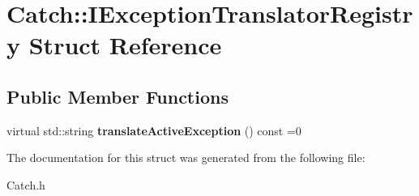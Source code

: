 \hypertarget{struct_catch_1_1_i_exception_translator_registry}{\section{Catch\-:\-:I\-Exception\-Translator\-Registry Struct Reference}
\label{struct_catch_1_1_i_exception_translator_registry}
}
\subsection*{Public Member Functions}
\begin{DoxyCompactItemize}
\item 
\hypertarget{struct_catch_1_1_i_exception_translator_registry_af76ae8c331a17f2a94c9720bc0d686bb}{virtual std\-::string {\bfseries translate\-Active\-Exception} () const =0}\label{struct_catch_1_1_i_exception_translator_registry_af76ae8c331a17f2a94c9720bc0d686bb}

\end{DoxyCompactItemize}


The documentation for this struct was generated from the following file\-:\begin{DoxyCompactItemize}
\item 
Catch.\-h\end{DoxyCompactItemize}
